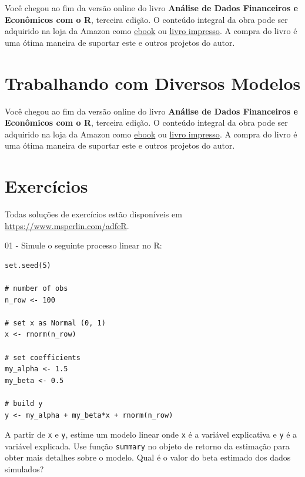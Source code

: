\documentclass[
  11pt,
]{book}
\newenvironment{pleasebuyit}
{\begin{noteblock}
		
	} {\end{noteblock}}
\begin{document}
\begin{pleasebuyit}
Você chegou ao fim da versão online do livro \textbf{Análise de Dados
Financeiros e Econômicos com o R}, terceira edição. O conteúdo integral
da obra pode ser adquirido na loja da Amazon como
\href{https://www.amazon.com.br/dp/B08WNC27ZY}{ebook} ou
\href{https://www.amazon.com/dp/B08WP8CCDB}{livro impresso}. A compra do
livro é uma ótima maneira de suportar este e outros projetos do autor.
\end{pleasebuyit}

\hypertarget{trabalhando-com-diversos-modelos}{%
\section{Trabalhando com Diversos Modelos}\label{trabalhando-com-diversos-modelos}}

\begin{pleasebuyit}
Você chegou ao fim da versão online do livro \textbf{Análise de Dados
Financeiros e Econômicos com o R}, terceira edição. O conteúdo integral
da obra pode ser adquirido na loja da Amazon como
\href{https://www.amazon.com.br/dp/B08WNC27ZY}{ebook} ou
\href{https://www.amazon.com/dp/B08WP8CCDB}{livro impresso}. A compra do
livro é uma ótima maneira de suportar este e outros projetos do autor.
\end{pleasebuyit}

\hypertarget{exerc-modelos}{%
\section{Exercícios}\label{exerc-modelos}}

Todas soluções de exercícios estão disponíveis em \url{https://www.msperlin.com/adfeR}.

01 -
Simule o seguinte processo linear no R:

\begin{verbatim}
set.seed(5)

# number of obs
n_row <- 100

# set x as Normal (0, 1)
x <- rnorm(n_row)

# set coefficients
my_alpha <- 1.5
my_beta <- 0.5

# build y
y <- my_alpha + my_beta*x + rnorm(n_row)
\end{verbatim}

A partir de \texttt{x} e \texttt{y}, estime um modelo linear onde \texttt{x} é a variável explicativa e \texttt{y} é a variável explicada. Use função \texttt{summary} no objeto de retorno da estimação para obter mais detalhes sobre o modelo. Qual é o valor do beta estimado dos dados simulados?
\end{document}
